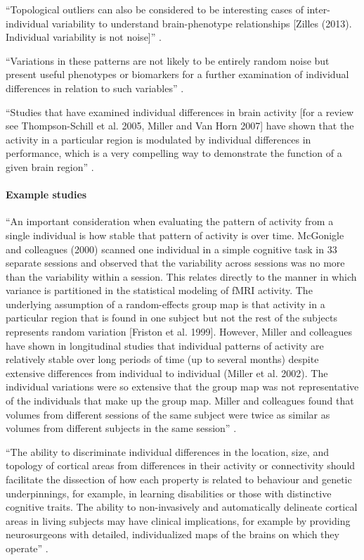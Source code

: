 %
``Topological outliers can also be considered to be interesting cases of
inter-individual variability to understand brain-phenotype relationships [Zilles
(2013). Individual variability is not noise]'' \citep{eickhoff2018imaging}.

%
``Variations in these patterns are not likely to be entirely random noise but
present useful phenotypes or biomarkers for a further examination of individual
differences in relation to such variables'' \citep{vanhorn2008individual}.

%
``Studies that have examined individual differences in brain activity [for a
review see Thompson-Schill et al. 2005, Miller and Van Horn 2007] have shown
that the activity in a particular region is modulated by individual differences
in performance, which is a very compelling way to demonstrate the function of a
given brain region'' \citep{vanhorn2008individual}.



\paragraph{Example studies}


``An important consideration when evaluating the pattern of activity from a
single individual is how stable that pattern of activity is over time.
%
McGonigle and colleagues (2000) scanned one individual in a simple cognitive
task in 33 separate sessions and observed that the variability across sessions
was no more than the variability within a session.
%
This relates directly to the manner in which variance is partitioned in the
statistical modeling of fMRI activity.
%
The underlying assumption of a random-effects group map is that activity in a
particular region that is found in one subject but not the rest of the subjects
represents random variation [Friston et al. 1999].
%
However, Miller and colleagues have shown in longitudinal studies that
individual patterns of activity are relatively stable over long periods of time
(up to several months) despite extensive differences from individual to
individual (Miller et al.  2002).
%
The individual variations were so extensive that the group map was not
representative of the individuals that make up the group map.
%
Miller and colleagues found that volumes from different sessions of the same
subject were twice as similar as volumes from different subjects in the same
session'' \citep{vanhorn2008individual}.



``The ability to discriminate individual differences in the location, size, and
topology of cortical areas from differences in their activity or connectivity
should facilitate the dissection of how each property is related to behaviour
and genetic underpinnings, for example, in learning disabilities or those with
distinctive cognitive traits.
%
The ability to non-invasively and automatically delineate cortical areas in
living subjects may have clinical implications, for example by providing
neurosurgeons with detailed, individualized maps of the brains on which they
operate'' \citep{glasser2016multi}.

